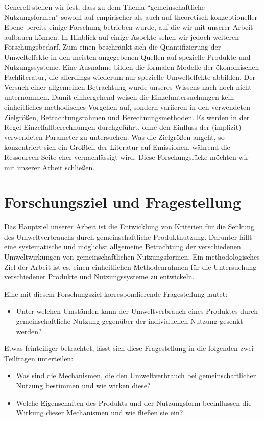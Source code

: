 \documentclass[11pt, titlepage=true]{scrartcl} %
\begin{document}
Generell stellen wir fest, dass zu dem Thema \enquote{gemeinschaftliche Nutzungsformen}
sowohl auf empirischer als auch auf theoretisch-konzeptioneller Ebene bereits einige Forschung
betrieben wurde, auf die wir mit unserer Arbeit aufbauen können. In Hinblick auf einige Aspekte sehen wir jedoch weiteren Forschungsbedarf. Zum einen beschränkt sich die Quantifizierung der Umwelteffekte in den meisten angegebenen Quellen auf spezielle Produkte und Nutzungssysteme. Eine Ausnahme bilden die formalen Modelle der ökonomischen Fachliteratur, die allerdings wiederum nur spezielle Umwelteffekte abbilden. Der Versuch einer allgemeinen Betrachtung wurde unseres Wissens nach noch nicht unternommen. Damit einhergehend weisen die Einzeluntersuchungen kein einheitliches methodisches Vorgehen auf, sondern variieren in den verwendeten Zielgrößen, Betrachtungsrahmen und Berechnungsmethoden. Es werden in der Regel Einzelfallberechnungen durchgeführt, ohne den Einfluss der (implizit) verwendeten Parameter zu untersuchen. Was die Zielgrößen angeht, so konzentriert sich ein Großteil der Literatur auf Emissionen, während die Ressourcen-Seite eher vernachlässigt wird. Diese Forschungslücke möchten wir mit unserer Arbeit schließen.
 
\section{Forschungsziel und Fragestellung}
Das Hauptziel unserer Arbeit ist die Entwicklung von Kriterien für die Senkung des Umweltverbrauchs durch gemeinschaftliche Produktnutzung. Darunter fällt eine systematische und möglichst allgemeine Betrachtung der verschiedenen Umweltwirkungen von gemeinschaftlichen Nutzungsformen. Ein methodologisches Ziel der Arbeit ist es, einen einheitlichen Methodenrahmen für die Untersuchung verschiedener Produkte und Nutzungssysteme zu entwickeln.

Eine mit diesem Forschungsziel korrespondierende Fragestellung lautet:
\begin{itemize}
	\item Unter welchen Umständen kann der Umweltverbrauch eines Produktes durch gemeinschaftliche Nutzung gegenüber der individuellen Nutzung gesenkt werden?
\end{itemize}
Etwas feinteiliger betrachtet, lässt sich diese Fragestellung in die folgenden zwei Teilfragen unterteilen:
\begin{itemize}
	\item Was sind die Mechanismen, die den Umweltverbrauch bei gemeinschaftlicher Nutzung bestimmen und wie wirken diese?
	\item Welche Eigenschaften des Produkts und der Nutzungsform beeinflussen die Wirkung dieser Mechanismen und wie fließen sie ein?
\end{itemize}
\end{document}
